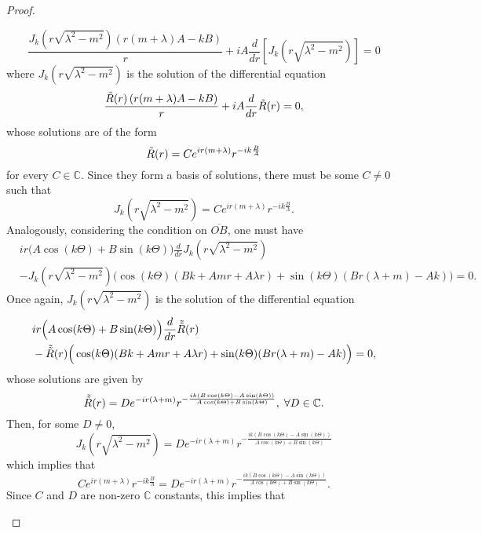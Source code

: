 \begin{proof}
\begin{enumerate}
    \[
        \frac{J_{k}\left(r \sqrt{\lambda^2-m^2}\right)\left(r(m+\lambda)A-k B\right)}{r} + i A \frac{d}{d r}\left[J_{k}\left(r \sqrt{\lambda^2-m^2}\right)\right]= 0
    \]
    where \(J_{k}\left(r \sqrt{\lambda^2-m^2}\right)\) is the solution of the differential equation
    \[
        \frac{\Tilde{R}(r) \left(r (m + \lambda)A - k B\right)}{r} + i A \frac{d}{d r}\Tilde{R}(r)= 0,
    \]
    whose solutions are of the form
    \[
        \Tilde{R}(r) = C e^{i r (m+\lambda)}r^{-i k\frac{ B}{A}}
    \]
    for every \(C \in \mathbb{C}\). Since they form a basis of solutions, there must be some \(C \neq 0\) such that
    \[
        J_{k}\left(r \sqrt{\lambda^2-m^2}\right) = C e^{i r (m+\lambda)}r^{-i k\frac{ B}{A}}.
    \]
    Analogously, considering the condition on \(\overline{OB}\), one must have
    \begin{align*}
        &i r \Big(A \cos (k\Theta  )+B \sin (k\Theta  )\Big) \frac{d}{d r}J_k\left(r \sqrt{\lambda ^2-m^2}\right)\\
        &-J_k\left(r \sqrt{\lambda ^2-m^2}\right) \Big(\cos (k\Theta )  (B k+A m r+A \lambda  r)+\sin (k\Theta  ) (B r (\lambda +m)-A k)\Big)=0.
    \end{align*}
    Once again, \(J_{k}\left(r \sqrt{\lambda^2-m^2}\right)\) is the solution of the differential equation
    \begin{align*}
        &i r \Big(A \cos (k\Theta  )+B \sin (k\Theta  )\Big) \frac{d}{d r}\Tilde{\Tilde{R}}(r)\\
        &-\Tilde{\Tilde{R}}(r) \Big(\cos (k\Theta )  (B k+A m r+A \lambda  r)+\sin (k\Theta  ) (B r (\lambda +m)-A k)\Big)=0,
    \end{align*}
    whose solutions are given by
    \[
        \Tilde{\Tilde{R}}(r) = D e^{-i r (\lambda +m)} r^{-\frac{i k (B \cos (k\Theta  )-A \sin (k\Theta  ))}{A \cos (k\Theta  )+B \sin (k\Theta  )}}, \; \forall D \in \mathbb{C}.
    \]
    Then, for some \(D \neq 0\),
    \[
        J_{k}\left(r \sqrt{\lambda^2-m^2}\right) = D e^{-i r (\lambda +m)} r^{-\frac{i k (B \cos (k\Theta  )-A \sin (k\Theta  ))}{A \cos (k\Theta  )+B \sin (k\Theta  )}}
    \]
    which implies that
    \[
        C e^{i r (m+\lambda)}r^{-i k\frac{ B}{A}} =  D e^{-i r (\lambda +m)} r^{-\frac{i k (B \cos (k\Theta  )-A \sin (k\Theta  ))}{A \cos (k\Theta  )+B \sin (k\Theta  )}}.
    \]
    Since \(C\) and \(D\) are non-zero \(\mathbb{C}\) constants, this implies that

\end{enumerate}
\end{proof}
